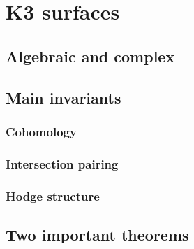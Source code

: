 \section{K3 surfaces}

\subsection{Algebraic and complex}

\subsection{Main invariants}

\subsubsection{Cohomology}
\subsubsection{Intersection pairing}
\subsubsection{Hodge structure}

\subsection{Two important theorems}